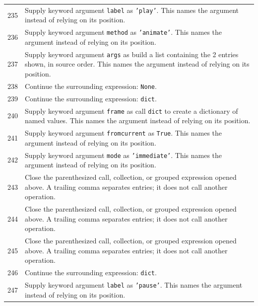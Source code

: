 \documentclass[11pt,a4paper]{book}
\begin{document}
\begin{longtable}{r p{}}
235 & Supply keyword argument \texttt{label} as \texttt{'play'}. This names the argument instead of relying on its position. \\

236 & Supply keyword argument \texttt{method} as \texttt{'animate'}. This names the argument instead of relying on its position. \\

237 & Supply keyword argument \texttt{args} as build a list containing the 2 entries shown, in source order. This names the argument instead of relying on its position. \\

238 & Continue the surrounding expression: \texttt{None}. \\

239 & Continue the surrounding expression: \texttt{dict}. \\

240 & Supply keyword argument \texttt{frame} as call \texttt{dict} to create a dictionary of named values. This names the argument instead of relying on its position. \\

241 & Supply keyword argument \texttt{fromcurrent} as \texttt{True}. This names the argument instead of relying on its position. \\

242 & Supply keyword argument \texttt{mode} as \texttt{'immediate'}. This names the argument instead of relying on its position. \\

243 & Close the parenthesized call, collection, or grouped expression opened above. A trailing comma separates entries; it does not call another operation. \\

244 & Close the parenthesized call, collection, or grouped expression opened above. A trailing comma separates entries; it does not call another operation. \\

245 & Close the parenthesized call, collection, or grouped expression opened above. A trailing comma separates entries; it does not call another operation. \\

246 & Continue the surrounding expression: \texttt{dict}. \\

247 & Supply keyword argument \texttt{label} as \texttt{'pause'}. This names the argument instead of relying on its position. \\


\end{longtable}
\end{document}
